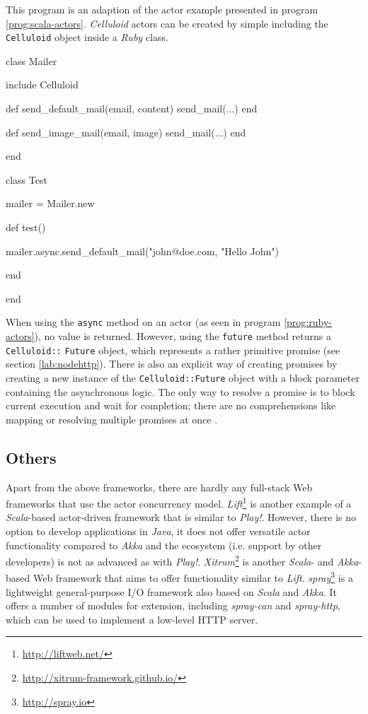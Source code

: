 \begin{program}
  \caption{This program is an adaption of the actor example presented in program \ref{prog:scala-actors}. \textit{Celluloid} actors can be created by simple including the \texttt{Celluloid} object inside a \textit{Ruby} class.}
  \label{prog:ruby-actors}
  \begin{JavaCode}

class Mailer
    
    include Celluloid

    def send_default_mail(email, content)
        send_mail(...)
    end

    def send_image_mail(email, image)
	    send_mail(...)
    end

end

class Test

    mailer = Mailer.new

    def test()
    
        mailer.async.send_default_mail("john@doe.com, "Hello John")

    end   

end
  \end{JavaCode}
\end{program}

When using the \texttt{async} method on an actor (as seen in program \ref{prog:ruby-actors}), no value is returned. However, using the \texttt{future} method returns a \texttt{Celluloid::} \texttt{Future} object, which represents a rather primitive promise (see section \ref{lab:nodehttp}). There is also an explicit way of creating promises by creating a new instance of the \texttt{Celluloid::Future} object with a block parameter containing the asynchronous logic. The only way to resolve a promise is to block current execution and wait for completion; there are no comprehensions like mapping or resolving multiple promises at once \cite{Arcieri2012}.

\subsection{Others}
Apart from the above frameworks, there are hardly any full-stack Web frameworks that use the actor concurrency model. \textit{Lift}\footnote{\url{http://liftweb.net/}} is another example of a \textit{Scala}-based actor-driven framework that is similar to \textit{Play!}. However, there is no option to develop applications in \textit{Java}, it does not offer versatile actor functionality compared to \textit{Akka} and the ecosystem (i.e. support by other developers) is not as advanced as with \textit{Play!}. \textit{Xitrum}\footnote{\url{http://xitrum-framework.github.io/}} is another \textit{Scala}- and \textit{Akka}-based Web framework that aims to offer functionality similar to \textit{Lift}. \textit{spray}\footnote{\url{http://spray.io}} is a lightweight general-purpose I/O framework also based on \textit{Scala} and \textit{Akka}. It offers a number of modules for extension, including \textit{spray-can} and \textit{spray-http}, which can be used to implement a low-level HTTP server.




